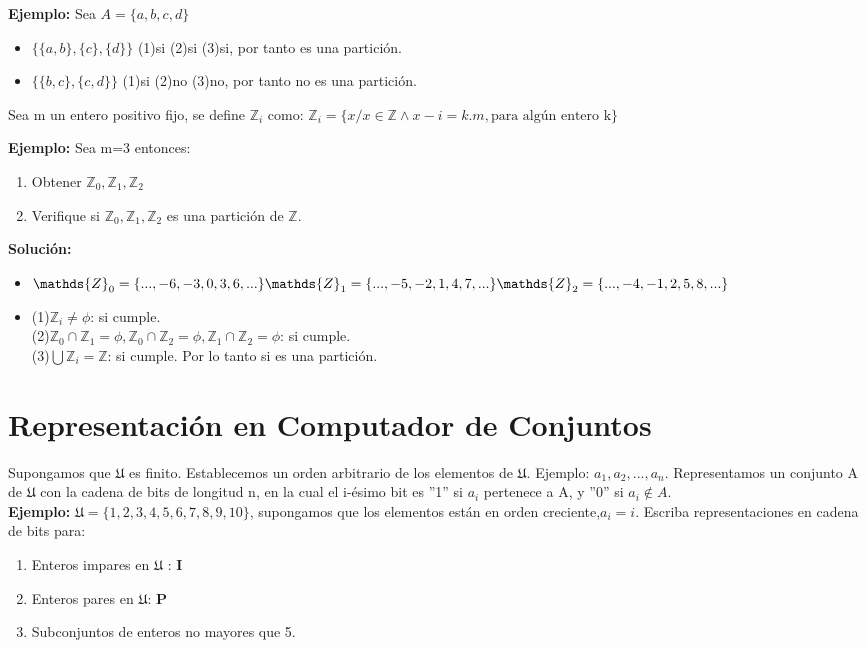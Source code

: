 \textbf{Ejemplo: }Sea $A=\lbrace a,b,c,d \rbrace$
\begin{itemize}
\item $\lbrace\lbrace a,b\rbrace,\lbrace c\rbrace,\lbrace d\rbrace \rbrace$ (1)si (2)si (3)si, por tanto es una partición.
\item $\lbrace\lbrace b,c\rbrace,\lbrace c,d\rbrace\rbrace$ (1)si (2)no (3)no, por tanto no es una partición.
\end{itemize}

Sea m un entero positivo fijo, se define $\mathds{Z}_i$ como:
$\mathds{Z}_i=\lbrace x/x \in \mathds{Z} \land x-i=k.m, \mbox{para algún entero k} \rbrace$

\textbf{Ejemplo: }Sea m=3 entonces:
\begin{enumerate}
\item Obtener $\mathds{Z}_0,\mathds{Z}_1,\mathds{Z}_2$
\item Verifique si $\mathds{Z}_0,\mathds{Z}_1,\mathds{Z}_2$ es una partición de $\mathds{Z}$.
\end{enumerate}

\textbf{Solución: }
\begin{itemize}
\item $\mathds{Z}_0=\lbrace ...,-6,-3,0,3,6,...\rbrace \\
		\mathds{Z}_1=\lbrace ...,-5,-2,1,4,7,...\rbrace \\
		\mathds{Z}_2=\lbrace ...,-4,-1,2,5,8,...\rbrace$
\item (1)$\mathds{Z}_i\not=\phi$: si cumple.\\
		(2)$\mathds{Z}_0\cap \mathds{Z}_1=\phi, \mathds{Z}_0\cap \mathds{Z}_2=\phi, \mathds{Z}_1\cap\mathds{Z}_2=\phi$: si cumple.\\
		(3)$\bigcup \mathds{Z}_i=\mathds{Z}$: si cumple. Por lo tanto si es una partición.
\end{itemize}

\section{Representación en Computador de Conjuntos}

Supongamos que $\mathfrak{U}$ es finito. Establecemos un orden arbitrario de los elementos de $\mathfrak{U}$. Ejemplo: $a_1,a_2,...,a_n$. Representamos un conjunto A de $\mathfrak{U}$ con la cadena de bits de longitud n, en la cual el i-ésimo bit es ''1'' si $a_i$ pertenece a A, y ''0'' si $a_i\not\in A$.\\
\textbf{Ejemplo: }$\mathfrak{U}=\lbrace 1,2,3,4,5,6,7,8,9,10\rbrace$, supongamos que los elementos están en orden creciente,$a_i=i$. Escriba representaciones en cadena de bits para:
\begin{enumerate}
\item Enteros impares en $\mathfrak{U}$ : \textbf{I}
\item Enteros pares en $\mathfrak{U}$: \textbf{P}
\item Subconjuntos de enteros no mayores que 5.
\end{enumerate}
 
